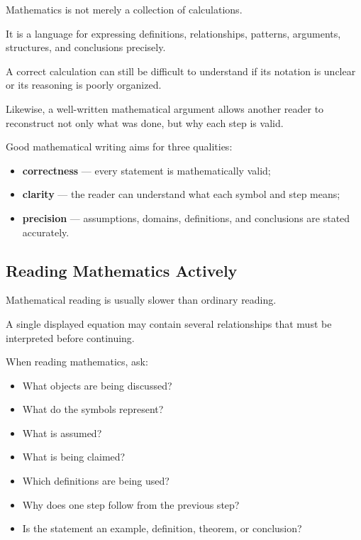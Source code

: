 Mathematics is not merely a collection of calculations.

It is a language for expressing definitions, relationships, patterns,
arguments, structures, and conclusions precisely.

A correct calculation can still be difficult to understand if its notation is
unclear or its reasoning is poorly organized.

Likewise, a well-written mathematical argument allows another reader to
reconstruct not only what was done, but why each step is valid.

\begin{conceptbox}
Good mathematical writing aims for three qualities:
\begin{itemize}
    \item \textbf{correctness} --- every statement is mathematically valid;
    \item \textbf{clarity} --- the reader can understand what each symbol and step means;
    \item \textbf{precision} --- assumptions, domains, definitions, and conclusions are stated accurately.
\end{itemize}
\end{conceptbox}

\subsection{Reading Mathematics Actively}
\label{subsec:reading-mathematics-actively}

Mathematical reading is usually slower than ordinary reading.

A single displayed equation may contain several relationships that must be
interpreted before continuing.

When reading mathematics, ask:

\begin{itemize}
    \item What objects are being discussed?
    \item What do the symbols represent?
    \item What is assumed?
    \item What is being claimed?
    \item Which definitions are being used?
    \item Why does one step follow from the previous step?
    \item Is the statement an example, definition, theorem, or conclusion?
\end{itemize}


